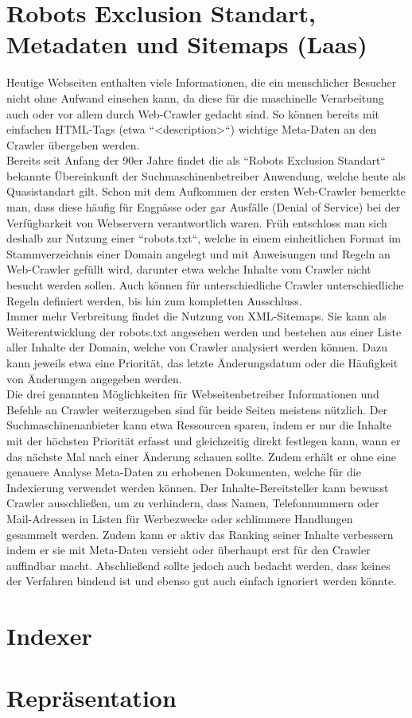 \section{Robots Exclusion Standart, Metadaten und Sitemaps (Laas)}
Heutige Webseiten enthalten viele Informationen, die ein menschlicher Besucher nicht ohne Aufwand einsehen kann, da diese für die maschinelle Verarbeitung auch oder vor allem durch Web-Crawler gedacht sind. So können bereits mit einfachen HTML-Tags (etwa ``<description>``) wichtige Meta-Daten an den Crawler übergeben werden.\\
Bereits seit Anfang der 90er Jahre findet die als ``Robots Exclusion Standart`` bekannte Übereinkunft der Suchmaschinenbetreiber Anwendung, welche heute als Quasistandart gilt. Schon mit dem Aufkommen der ersten Web-Crawler bemerkte man, dass diese häufig für Engpässe oder gar Ausfälle (Denial of Service) bei der Verfügbarkeit von Webservern verantwortlich waren. Früh entschloss man sich deshalb zur Nutzung einer ``robots.txt``, welche in einem einheitlichen Format im Stammverzeichnis einer Domain angelegt und mit Anweisungen und Regeln an Web-Crawler gefüllt wird, darunter etwa welche Inhalte vom Crawler nicht besucht werden sollen. Auch können für unterschiedliche Crawler unterschiedliche Regeln definiert werden, bis hin zum kompletten Ausschluss.\\
Immer mehr Verbreitung findet die Nutzung von XML-Sitemaps. Sie kann als Weiterentwicklung der robots.txt angesehen werden und bestehen aus einer Liste aller Inhalte der Domain, welche von Crawler analysiert werden können. Dazu kann jeweils etwa eine Priorität, das letzte Änderungsdatum oder die Häufigkeit von Änderungen angegeben werden.\\
Die drei genannten Möglichkeiten für Webseitenbetreiber Informationen und Befehle an Crawler weiterzugeben sind für beide Seiten meistens nützlich. Der Suchmaschinenanbieter kann etwa Ressourcen sparen, indem er nur die Inhalte mit der höchsten Priorität erfasst und gleichzeitig direkt festlegen kann, wann er das nächste Mal nach einer Änderung schauen sollte. Zudem erhält er ohne eine genauere Analyse Meta-Daten zu erhobenen Dokumenten, welche für die Indexierung verwendet werden können. Der Inhalte-Bereitsteller kann bewusst Crawler ausschließen, um zu verhindern, dass Namen, Telefonnummern oder Mail-Adressen in Listen für Werbezwecke oder schlimmere Handlungen gesammelt werden. Zudem kann er aktiv das Ranking seiner Inhalte verbessern indem er sie mit Meta-Daten versieht oder überhaupt erst für den Crawler auffindbar macht. Abschließend sollte jedoch auch bedacht werden, dass keines der Verfahren bindend ist und ebenso gut auch einfach ignoriert werden könnte.

\section{Indexer}

\section{Repräsentation}